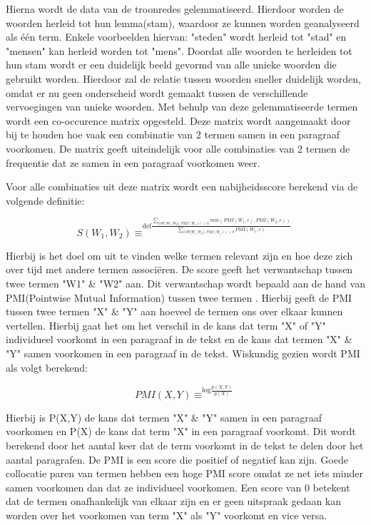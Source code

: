 Hierna wordt de data van de troonredes gelemmatiseerd. Hierdoor worden de woorden herleid tot hun lemma(stam), waardoor ze kunnen worden geanalyseerd als één term. Enkele voorbeelden hiervan: "steden" wordt herleid tot "stad" en "mensen" kan herleid worden tot "mens". Doordat alle woorden te herleiden tot hun stam wordt er een duidelijk beeld gevormd van alle unieke woorden die gebruikt worden. Hierdoor zal de relatie tussen woorden sneller duidelijk worden, omdat er nu geen onderscheid wordt gemaakt tussen de verschillende vervoegingen van unieke woorden. Met behulp van deze gelemmatiseerde termen wordt een co-occurence matrix opgesteld. Deze matrix wordt aangemaakt door bij te houden hoe vaak een combinatie van 2 termen samen in een paragraaf voorkomen. De matrix geeft uiteindelijk voor alle combinaties van 2 termen de frequentie dat ze samen in een paragraaf voorkomen weer.

Voor alle combinaties uit deze matrix wordt een nabijheidsscore berekend via de volgende definitie: 

 $$S(W_1,W_2)\equiv^{\mathrm{def}\frac{\sum_{c\epsilon W\setminus{W_1,W_2\},PMI(W_1,c)>0}}min(PMI(W_1,c),PMI(W_2,c))}{\sum_{c\epsilon W\{W_1,W_2\},PMI(W_1,c)>0}PMI(W_1,c)}}$$ 

Hierbij is het doel om uit te vinden welke termen relevant zijn en hoe deze zich over tijd met andere termen associëren. De score geeft het verwantschap tussen twee termen "W1" \& "W2" aan. Dit verwantschap wordt bepaald aan de hand van PMI(Pointwise Mutual Information) tussen twee termen \citep{bouma2009normalized}. Hierbij geeft de PMI tussen twee termen "X" \& "Y" aan hoeveel de termen ons over elkaar kunnen vertellen. Hierbij gaat het om het verschil in de kans dat term "X" of "Y" individueel voorkomt in een paragraaf in de tekst en de kans dat termen "X" \& "Y" samen voorkomen in een paragraaf in de tekst. Wiskundig gezien wordt PMI als volgt berekend: 

$$PMI(X,Y)\equiv^{\mathrm{log}\frac{p(X,Y)}{p(X)}}$$

Hierbij is P(X,Y) de kans dat termen "X" \& "Y" samen in een paragraaf voorkomen en P(X) de kans dat term "X" in een paragraaf voorkomt. Dit wordt berekend door het aantal keer dat de term voorkomt in de tekst te delen door het aantal paragrafen. De PMI is een score die positief of negatief kan zijn. Goede collocatie paren van termen hebben een hoge PMI score omdat ze net iets minder samen voorkomen dan dat ze individueel voorkomen.  Een score van 0 betekent dat de termen onafhankelijk van elkaar zijn en er geen uitspraak gedaan kan worden over het voorkomen van term "X" als "Y" voorkomt en vice versa.

